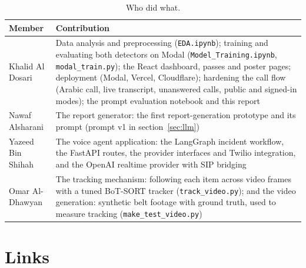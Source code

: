 \documentclass[11pt,a4paper]{article}
\newcommand{\code}[1]{\texttt{#1}}
\begin{document}
\begin{table}[H]
\centering
\small
\begin{tabularx}{\textwidth}{@{}P{3.6cm}L@{}}
\toprule
Member & Contribution \\
\midrule
Khalid Al Dosari & Data analysis and preprocessing (\code{EDA.ipynb}); training and evaluating both
detectors on Modal (\code{Model\_Training.ipynb}, \code{modal\_train.py}); the React dashboard,
passes and poster pages; deployment (Modal, Vercel,
Cloudflare); hardening the call flow (Arabic call, live transcript, unanswered calls, public and
signed-in modes); the prompt evaluation notebook and this report \\
Nawaf Alsharani & The report generator: the first report-generation prototype and its prompt (prompt v1
in section~\ref{sec:llm}) \\
Yazeed Bin Shihah & The voice agent application: the LangGraph incident workflow, the FastAPI routes,
the provider interfaces and Twilio integration, and the OpenAI realtime provider with SIP bridging \\
Omar Al-Dhawyan & The tracking mechanism: following each item across video frames with a tuned
BoT-SORT tracker (\code{track\_video.py}); and the video generation: synthetic belt footage with
ground truth, used to measure tracking (\code{make\_test\_video.py}) \\
\bottomrule
\end{tabularx}
\caption{Who did what.}
\end{table}

\section{Links}
\end{document}
